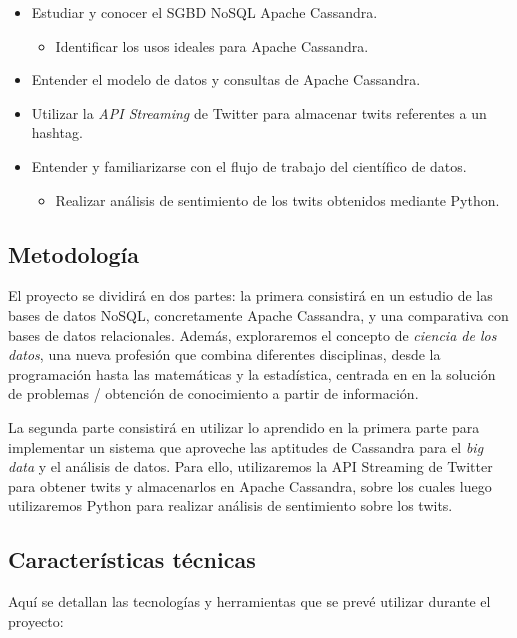 \begin{itemize}
    \item Estudiar y conocer el SGBD NoSQL Apache Cassandra.
      \begin{itemize}
      \item Identificar los usos ideales para Apache Cassandra.
      \end{itemize}
    \item Entender el modelo de datos y consultas de Apache Cassandra.
    \item Utilizar la \emph{API Streaming} de Twitter para almacenar twits
      referentes a un hashtag.
    \item Entender y familiarizarse con el flujo de trabajo del científico de datos.
      \begin{itemize}
      \item Realizar análisis de sentimiento de los twits obtenidos mediante Python.
      \end{itemize}
\end{itemize}

\subsection{Metodología}
\label{subsec:metodologia}

El proyecto se dividirá en dos partes: la primera consistirá en un estudio de
las bases de datos NoSQL, concretamente Apache Cassandra, y una
comparativa con bases de datos relacionales. Además, exploraremos el concepto de
\emph{ciencia de los datos}, una nueva profesión que combina diferentes
disciplinas, desde la programación hasta las matemáticas y la estadística,
centrada en en la solución de problemas / obtención de conocimiento a partir de
información. 

La segunda parte consistirá en utilizar lo aprendido en la primera parte para
implementar un sistema que aproveche las aptitudes de Cassandra para el
\emph{big data} y el análisis de datos. Para ello, utilizaremos la API Streaming
de Twitter para obtener twits y almacenarlos en Apache Cassandra, sobre los
cuales luego utilizaremos Python para realizar análisis de sentimiento sobre los
twits.

\subsection{Características técnicas}
\label{subsec:planificació}

Aquí se detallan las tecnologías y herramientas que se prevé
utilizar durante el proyecto:

